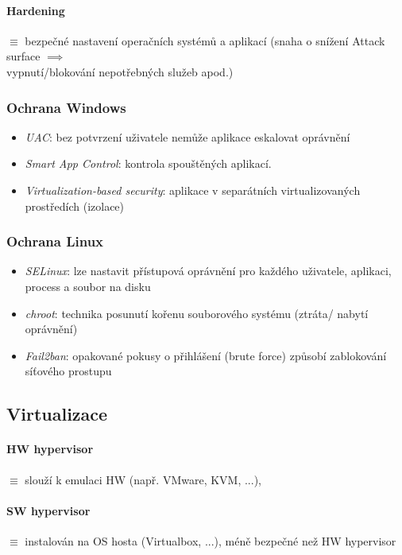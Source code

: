 \documentclass[10pt,a4paper]{article}
\begin{document}
\paragraph*{Hardening} $\equiv$ bezpečné nastavení operačních systémů a aplikací (snaha o snížení Attack surface $\implies$ \\vypnutí/blokování nepotřebných služeb apod.)

\subsubsection*{Ochrana Windows}
\begin{itemize}
    \item \textit{UAC}: bez potvrzení uživatele nemůže aplikace eskalovat oprávnění
    \item \textit{Smart App Control}: kontrola spouštěných aplikací.
    \item \textit{Virtualization-based security}:  aplikace v separátních virtualizovaných prostředích (izolace)
\end{itemize}

\subsubsection*{Ochrana Linux}
\begin{itemize}
    \item \textit{SELinux}: lze nastavit přístupová oprávnění pro každého uživatele, aplikaci, process a soubor na disku
    \item \textit{chroot}: technika posunutí kořenu souborového systému (ztráta/ nabytí oprávnění)
    \item \textit{Fail2ban}:  opakované pokusy o přihlášení (brute force) způsobí zablokování síťového prostupu
\end{itemize}

\subsection{Virtualizace}
\paragraph*{HW hypervisor} $\equiv$ slouží k emulaci HW (např. VMware, KVM, ...), 
\paragraph*{SW hypervisor} $\equiv$ instalován na OS hosta (Virtualbox, ...), méně bezpečné než HW hypervisor
\end{document}
